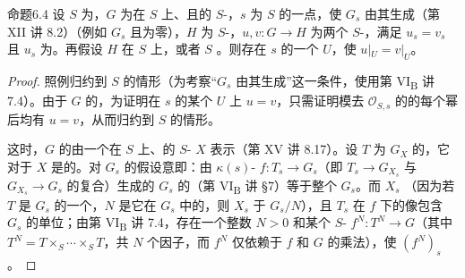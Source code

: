\begin{SGAresult}{命题}{6.4}
设 $S$ 为，$G$ 为在 $S$ 上、且的 $S$-，$s$ 为 $S$ 的一点，使 $G_s$ 由其生成（第 XII 讲 8.2）（例如 $G_s$ 且为零），$H$ 为 $S$-，$u,v:G\to H$ 为两个 $S$-，满足 $u_s=v_s$ 且 $u_s$ 为。再假设 $H$ 在 $S$ 上，或者 $S$ 。则存在 $s$ 的一个 $U$，使 $u|_U=v|_U$。
\end{SGAresult}
\begin{proof}
照例归约到 $S$ 的情形（为考察“$G_s$ 由其生成”这一条件，使用第 VI\textsubscript{B} 讲 7.4）。由于 $G$ 的，为证明在 $s$ 的某个 $U$ 上 $u=v$，只需证明模去 $\mathscr O_{S,s}$ 的的每个幂后均有 $u=v$，从而归约到 $S$ 的情形。

这时，$G$ 的由一个在 $S$ 上、的 $S$- $X$ 表示（第 XV 讲 8.17）。设 $T$ 为 $G_X$ 的，它对于 $X$ 是的。对 $G_s$ 的假设意即：由 $\kappa(s)$- $f:T_s\to G_s$（即 $T_s\to G_{X_s}$ 与 $G_{X_s}\to G_s$ 的复合）生成的 $G_s$ 的（第 VI\textsubscript{B} 讲 §7）等于整个 $G_s$。而 $X_s$ （因为若 $T$ 是 $G_s$ 的一个，$N$ 是它在 $G_s$ 中的，则 $X_s$ 于 $G_s/N$），且 $T_s$ 在 $f$ 下的像包含 $G_s$ 的单位；由第 VI\textsubscript{B} 讲 7.4，存在一个整数 $N>0$ 和某个 $S$- $f^N:T^N\to G$（其中 $T^N=T\times_S\cdots\times_S T$，共 $N$ 个因子，而 $f^N$ 仅依赖于 $f$ 和 $G$ 的乘法），使 $(f^N)_s$ 。


\end{proof}
